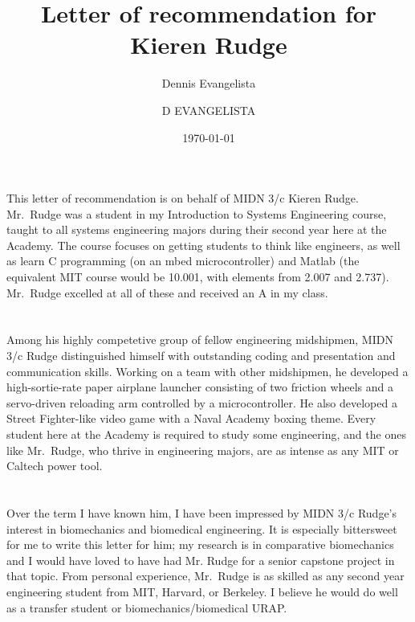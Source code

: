 \documentclass[12pt,courier]{navyletter}
\author{Dennis Evangelista}
\title{Letter of recommendation for Kieren Rudge}
\date{\today}
\begin{document}
\makedateblock{}

\begin{navyletterheader}
\navyskip{}%
\navysubjline%
\end{navyletterheader}

\section{}
This letter of recommendation is on behalf of MIDN 3/c Kieren Rudge.  Mr.~Rudge was a student in my Introduction to Systems Engineering course, taught to all systems engineering majors during their second year here at the Academy. The course focuses on getting students to think like engineers, as well as learn C programming (on an mbed microcontroller) and Matlab (the equivalent MIT course would be 10.001, with elements from 2.007 and 2.737). Mr.~Rudge excelled at all of these and received an A in my class. 

\section{} 
Among his highly competetive group of fellow engineering midshipmen, MIDN 3/c Rudge distinguished himself with outstanding coding and presentation and communication skills.  Working on a team with other midshipmen, he developed a high-sortie-rate paper airplane launcher consisting of two friction wheels and a servo-driven reloading arm controlled by a microcontroller.   He also developed a Street Fighter-like video game with a Naval Academy boxing theme.  Every student here at the Academy is required to study some engineering, and the ones like Mr.~Rudge, who thrive in engineering majors, are as intense as any MIT or Caltech power tool.  

\section{}
Over the term I have known him, I have been impressed by MIDN 3/c Rudge's interest in biomechanics and biomedical engineering.  It is especially bittersweet for me to write this letter for him; my research is in comparative biomechanics and I would have loved to have had Mr. Rudge for a senior capstone project in that topic.  From personal experience, Mr.~Rudge is as skilled as any second year engineering student from MIT, Harvard, or Berkeley.  I believe he would do well as a transfer student or biomechanics/biomedical URAP. 


\noclosing{}\\
\noindent\hspace*{4in}
\signature{D EVANGELISTA}

\end{document}
